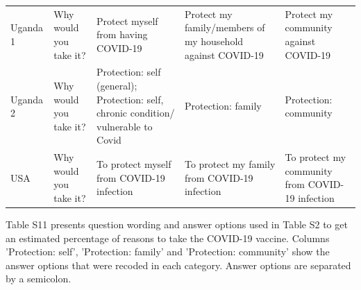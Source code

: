 \documentclass[
  12pt,
]{article}
\begin{document}
\begin{table}[!h]
{\begin{threeparttable}
\begin{tabular}[t]{>{\raggedright\arraybackslash}p{8em}>{\raggedright\arraybackslash}p{8em}>{\raggedright\arraybackslash}p{10em}>{\raggedright\arraybackslash}p{10em}>{\raggedright\arraybackslash}p{10em}}
Uganda 1 & Why would you take it? & Protect myself from having COVID-19 & Protect my family/members of my household against COVID-19 & Protect my community against COVID-19\\
Uganda 2 & Why would you take it? & Protection: self (general); Protection: self, chronic condition/ vulnerable to Covid & Protection: family & Protection: community\\
USA & Why would you take it? & To protect myself from COVID-19 infection & To protect my family from COVID-19 infection & To protect my community from COVID-19 infection\\
\bottomrule
\end{tabular}
\begin{tablenotes}
\item Table S11 presents question wording and answer options used in Table S2 to get an estimated percentage of reasons to take the COVID-19 vaccine. Columns 'Protection: self', 'Protection: family' and  'Protection: community' show the answer options that were recoded in each category. Answer options are separated by a semicolon.
\end{tablenotes}
\end{threeparttable}}
\end{table}
\end{document}
